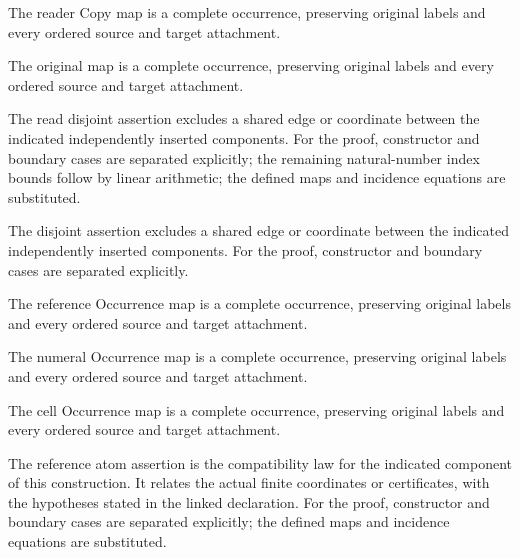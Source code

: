 The reader Copy map is a complete occurrence, preserving original labels and every ordered source and target attachment.
\par{}

The original map is a complete occurrence, preserving original labels and every ordered source and target attachment.
\par{}

The read disjoint assertion excludes a shared edge or coordinate between the indicated independently inserted components.
For the proof, constructor and boundary cases are separated explicitly; the remaining natural-number index bounds follow by linear arithmetic; the defined maps and incidence equations are substituted.
\par{}

The disjoint assertion excludes a shared edge or coordinate between the indicated independently inserted components.
For the proof, constructor and boundary cases are separated explicitly.
\par{}

The reference Occurrence map is a complete occurrence, preserving original labels and every ordered source and target attachment.
\par{}

The numeral Occurrence map is a complete occurrence, preserving original labels and every ordered source and target attachment.
\par{}

The cell Occurrence map is a complete occurrence, preserving original labels and every ordered source and target attachment.
\par{}

The reference atom assertion is the compatibility law for the indicated component of this construction. It relates the actual finite coordinates or certificates, with the hypotheses stated in the linked declaration.
For the proof, constructor and boundary cases are separated explicitly; the defined maps and incidence equations are substituted.
\par{}

